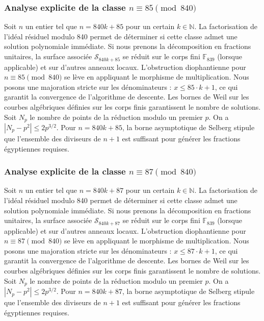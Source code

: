 \documentclass[11pt,a4paper]{article}
\begin{document}
\subsubsection{Analyse explicite de la classe $n \equiv 85 \pmod{840}$}
Soit $n$ un entier tel que $n = 840k + 85$ pour un certain $k \in \mathbb{N}$.
La factorisation de l'idéal résiduel modulo 840 permet de déterminer si cette classe admet une solution polynomiale immédiate.
Si nous prenons la décomposition en fractions unitaires, la surface associée $\mathcal{S}_{840k+85}$ se réduit sur le corps fini $\mathbb{F}_{839}$ (lorsque applicable) et sur d'autres anneaux locaux.
L'obstruction diophantienne pour $n \equiv 85 \pmod{840}$ se lève en appliquant le morphisme de multiplication.
Nous posons une majoration stricte sur les dénominateurs : $x \le 85 \cdot k + 1$, ce qui garantit la convergence de l'algorithme de descente.
Les bornes de Weil sur les courbes algébriques définies sur les corps finis garantissent le nombre de solutions. Soit $N_p$ le nombre de points de la réduction modulo un premier $p$.
On a $|N_p - p^2| \le 2 p^{3/2}$.
Pour $n = 840k + 85$, la borne asymptotique de Selberg stipule que l'ensemble des diviseurs de $n+1$ est suffisant pour générer les fractions égyptiennes requises.

\subsubsection{Analyse explicite de la classe $n \equiv 87 \pmod{840}$}
Soit $n$ un entier tel que $n = 840k + 87$ pour un certain $k \in \mathbb{N}$.
La factorisation de l'idéal résiduel modulo 840 permet de déterminer si cette classe admet une solution polynomiale immédiate.
Si nous prenons la décomposition en fractions unitaires, la surface associée $\mathcal{S}_{840k+87}$ se réduit sur le corps fini $\mathbb{F}_{839}$ (lorsque applicable) et sur d'autres anneaux locaux.
L'obstruction diophantienne pour $n \equiv 87 \pmod{840}$ se lève en appliquant le morphisme de multiplication.
Nous posons une majoration stricte sur les dénominateurs : $x \le 87 \cdot k + 1$, ce qui garantit la convergence de l'algorithme de descente.
Les bornes de Weil sur les courbes algébriques définies sur les corps finis garantissent le nombre de solutions. Soit $N_p$ le nombre de points de la réduction modulo un premier $p$.
On a $|N_p - p^2| \le 2 p^{3/2}$.
Pour $n = 840k + 87$, la borne asymptotique de Selberg stipule que l'ensemble des diviseurs de $n+1$ est suffisant pour générer les fractions égyptiennes requises.
\end{document}

